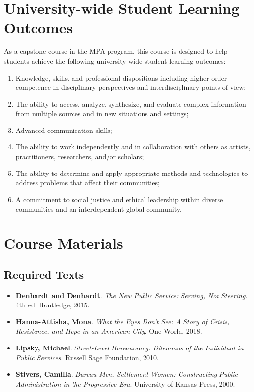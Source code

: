 \documentclass[11pt, letterpaper]{article}
\begin{document}
\section{University-wide Student Learning Outcomes}
    As a capstone course in the MPA program, this course is designed to help students achieve the following university-wide student learning outcomes:
    \begin{enumerate}
        \item Knowledge, skills, and professional dispositions including higher order competence in disciplinary perspectives and interdisciplinary points of view;
        \item The ability to access, analyze, synthesize, and evaluate complex information from multiple sources and in new situations and settings;
        \item Advanced communication skills;
        \item The ability to work independently and in collaboration with others as artists, practitioners, researchers, and/or scholars;
        \item The ability to determine and apply appropriate methods and technologies to address problems that affect their communities; 
        \item A commitment to social justice and ethical leadership within diverse communities and an interdependent global community.
    \end{enumerate}

    \section{Course Materials}
    \subsection*{Required Texts}
    \begin{itemize}
        \item \textbf{Denhardt and Denhardt}. \textit{The New Public Service: Serving, Not Steering}. 4th ed. Routledge, 2015.
        \item \textbf{Hanna-Attisha, Mona}. \textit{What the Eyes Don't See: A Story of Crisis, Resistance, and Hope in an American City}. One World, 2018.
        \item \textbf{Lipsky, Michael}. \textit{Street-Level Bureaucracy: Dilemmas of the Individual in Public Services}. Russell Sage Foundation, 2010.
        \item \textbf{Stivers, Camilla}. \textit{Bureau Men, Settlement Women: Constructing Public Administration in the Progressive Era}. University of Kansas Press, 2000.
    \end{itemize}
\end{document}
